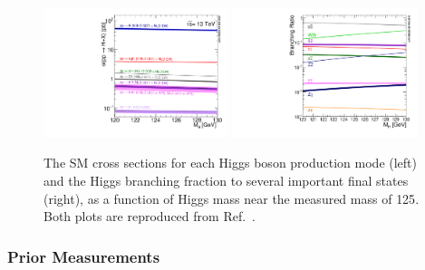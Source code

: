 \begin{figure}[htbp]
  \begin{center}
    \includegraphics[width=0.48\textwidth]{phenomenology/plot_13tev_H_sqrt.pdf}
    \includegraphics[width=0.48\textwidth]{phenomenology/SMHiggsBR_YR4-square.pdf}
    \caption[Higgs boson SM cross section and branching ratio, as a function of $m_\PH$]{
        The SM cross sections for each Higgs boson production mode (left) and the Higgs branching fraction to several important final states (right), as a function of Higgs mass near the measured mass of {125\GeV}.
        Both plots are reproduced from Ref.~\cite{deFlorian:2016spz}.
      }\label{fig:HxsecBR}
  \end{center}
\end{figure}

\subsubsection{Prior Measurements}\label{sec:Hresults}


